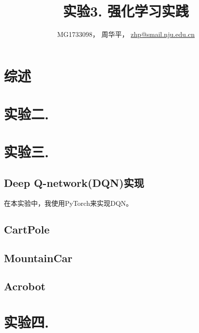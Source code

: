 \documentclass[a4paper,UTF8]{article}
\theoremstyle{definition}
\begin{document}
\title{实验3. 强化学习实践}
\author{MG1733098， 周华平， \url{zhp@smail.nju.edu.cn}}
\maketitle

\section*{综述}



\section*{实验二. }



\section*{实验三. }



\subsection*{Deep Q-network(DQN)实现}

在本实验中，我使用PyTorch来实现DQN。




\subsection*{CartPole}


\subsection*{MountainCar}

\subsection*{Acrobot}

\section*{实验四. }
\end{document}
